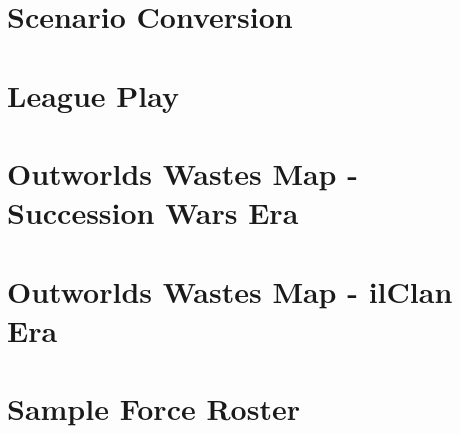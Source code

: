 \documentclass{article}
\begin{document}
\section{Scenario Conversion}



\newpage

\section{League Play}



\newpage

\section{Outworlds Wastes Map - Succession Wars Era}



\newpage

\section{Outworlds Wastes Map - ilClan Era}



\newpage

\section{Sample Force Roster}



\newpage
\end{document}
